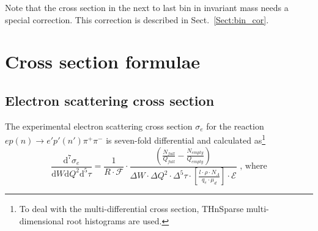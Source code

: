 Note that the cross section in the next to last bin in invariant mass needs a special correction. This correction is described in Sect.~\ref{Sect:bin_cor}.




\section{Cross section formulae}
\label{Sect:cr_sect_formula}

\subsection{Electron scattering cross section}

The experimental electron scattering cross section $\sigma_{e}$ for the reaction $ep(n) \rightarrow e'p'(n') \pi^{+} \pi^{-}$ is seven-fold differential and calculated as\footnote[10]{To deal with the multi-differential cross section, THnSparse multi-dimensional root histograms are used.}
\begin{equation}
\frac{\textrm{d}^{7}\sigma_{e}}{\textrm{d}W\textrm{d}Q^{2}\textrm{d}^{5}\tau} = \frac{1}{ R \! \cdot \! \mathcal{F}}  \cdot 
\frac{\left( \frac{N_{full}}{Q_{full}}-\frac{N_{empty}}{Q_{empty}} \right)}{
\Delta W \! \cdot \! \Delta Q^{2} \! \cdot \! \Delta^{5} \tau \! \cdot \! \left[ \frac{l \cdot \rho \cdot N_{A}}{q_{e}\cdot \mu_{d}} \right]\! \cdot \!\mathcal{E}} \textrm{ , where}
\label{expcrossect}
\end{equation}
